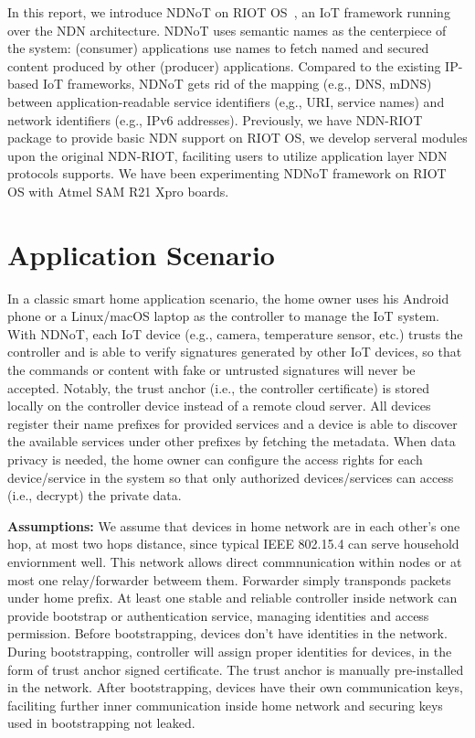 \documentclass[sigconf]{acmart}
\begin{document}
In this report, we introduce NDNoT on RIOT OS~\cite{baccelli2018riot}, an IoT framework running over the NDN architecture.
NDNoT uses semantic names as the centerpiece of the system: (consumer) applications use names to fetch named and secured content produced by other (producer) applications.
Compared to the existing IP-based IoT frameworks, NDNoT gets rid of the mapping (e.g., DNS, mDNS) between application-readable service identifiers (e,g., URI, service names) and network identifiers (e.g., IPv6 addresses).
Previously, we have NDN-RIOT~\cite{ndn-iot} package to provide basic NDN support on RIOT OS, we develop serveral modules upon the original NDN-RIOT, faciliting users to utilize application layer NDN protocols supports. 
We have been experimenting NDNoT framework on RIOT OS with Atmel SAM R21 Xpro boards.

\section{Application Scenario}

In a classic smart home application scenario, the home owner uses his Android phone or a Linux/macOS laptop as the controller to manage the IoT system.
With NDNoT, each IoT device (e.g., camera, temperature sensor, etc.) trusts the controller and is able to verify signatures generated by other IoT devices, so that the commands or content with fake or untrusted signatures will never be accepted.
Notably, the trust anchor (i.e., the controller certificate) is stored locally on the controller device instead of a remote cloud server.
All devices register their name prefixes for provided services and a device is able to discover the available services under other prefixes by fetching the metadata.
When data privacy is needed, the home owner can configure the access rights for each device/service in the system so that only authorized devices/services can access (i.e., decrypt) the private data.

\textbf{Assumptions:} We assume that devices in home network are in each other's one hop, at most two hops distance, since typical IEEE 802.15.4 can serve household enviornment well. This network allows direct commnunication within nodes or at most one relay/forwarder betweem them. 
Forwarder simply transponds packets under home prefix. 
At least one stable and reliable controller inside network can provide bootstrap or authentication service, managing identities and access permission. Before bootstrapping, devices don't have identities in the network. During bootstrapping, controller will assign proper identities for devices, 
in the form of trust anchor signed certificate. The trust anchor is manually pre-installed in the network. After bootstrapping, devices have their own communication keys, faciliting further inner communication inside home network and securing keys used in bootstrapping not leaked. 
\end{document}
